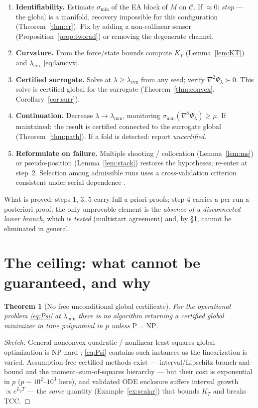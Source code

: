 \documentclass[11pt]{article}
\theoremstyle{plain}
\newtheorem{theorem}{Theorem}[section]
\theoremstyle{definition}
\theoremstyle{remark}
\begin{document}
\begin{enumerate}
\item \textbf{Identifiability.} Estimate $\sigma_{\min}$ of the EA block
of $M$ on $\mathcal C$. If $\approx0$: \emph{stop} --- the global is a
manifold, recovery impossible for this configuration
(Theorem~\ref{thm:cr}). Fix by adding a non-collinear sensor
(Proposition~\ref{prop:tworad}) or removing the degenerate channel.
\item \textbf{Curvature.} From the force/state bounds compute $K_T$
(Lemma~\ref{lem:KT}) and $\lambda_{\mathrm{cvx}}$ \eqref{eq:lamcvx}.
\item \textbf{Certified surrogate.} Solve at
$\lambda\ge\lambda_{\mathrm{cvx}}$ from any seed; verify
$\nabla^{2}\Psi_\lambda\succ0$. This solve is certified global for the
surrogate (Theorem~\ref{thm:convex}, Corollary~\ref{cor:surr}).
\item \textbf{Continuation.} Decrease $\lambda\to\lambda_{\min}$,
monitoring $\sigma_{\min}(\nabla^{2}\Psi_\lambda)\ge\mu$. If maintained:
the result is certified connected to the surrogate global
(Theorem~\ref{thm:path}). If a fold is detected: report
\emph{uncertified}.
\item \textbf{Reformulate on failure.} Multiple shooting / collocation
(Lemma~\ref{lem:ms}) or pseudo-position (Lemma~\ref{lem:stack}) restores
the hypotheses; re-enter at step~2. Selection among admissible runs uses
a cross-validation criterion consistent under serial dependence
\cite{racine2000,burman1994,arlot2010}.
\end{enumerate}

\noindent What is proved: steps 1, 3, 5 carry full a-priori proofs; step
4 carries a per-run a-posteriori proof; the only unprovable element is
the \emph{absence of a disconnected lower branch}, which is \emph{tested}
(multistart agreement) and, by \S\ref{sec:ceiling}, cannot be eliminated
in general.

\section{The ceiling: what cannot be guaranteed, and why}
\label{sec:ceiling}

\begin{theorem}[No free unconditional global certificate]\label{thm:ceil}
For the operational problem \eqref{eq:Psi} at $\lambda_{\min}$ there is
no algorithm returning a certified global minimizer in time polynomial in
$p$ unless $\mathrm{P}=\mathrm{NP}$.
\end{theorem}
\begin{proof}[Sketch]
General nonconvex quadratic / nonlinear least-squares global optimization
is NP-hard \cite{murty1987}; \eqref{eq:Psi} contains such instances as
the linearization is varied. Assumption-free certified methods exist ---
interval/Lipschitz branch-and-bound and the moment--sum-of-squares
hierarchy \cite{neumaier2004,lasserre2001} --- but their cost is
exponential in $p$ ($p\sim10^{2}$--$10^{3}$ here), and validated ODE
enclosure suffers interval growth $\propto e^{L_gT}$ --- the \emph{same}
quantity (Example~\ref{ex:scalar}) that bounds $K_T$ and breaks TCC.
\end{proof}
\end{document}
